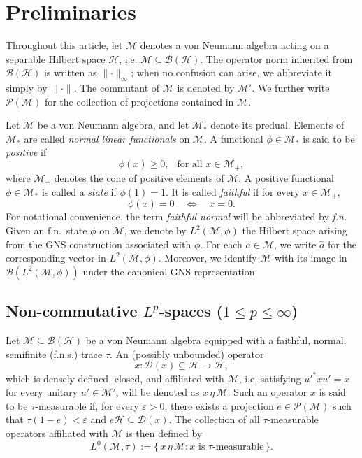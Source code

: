 \documentclass[11pt]{amsart}
\theoremstyle{definition}
\theoremstyle{myremark}
\numberwithin{equation}{section}
\newcommand{\CB}{\mathcal{B}}
\newcommand{\CM}{\mathcal{M}}
\begin{document}
\section{\textbf{Preliminaries}}\label{preli}
\noindent Throughout this article, let \(\mathcal{M}\) denotes a von Neumann algebra acting on a separable Hilbert space \(\mathcal{H}\),  i.e. $\mathcal{M}\subseteq \mathcal{B}(\mathcal{H})$. The operator norm inherited from \(\mathcal{B}(\mathcal{H})\) is written as \(\lVert \cdot \rVert_\infty\); when no confusion can arise, we abbreviate it simply by \(\lVert \cdot \rVert\). The commutant of \(\mathcal{M}\) is denoted by \(\mathcal{M}'\). We further write \(\mathcal{P}(\mathcal{M})\) for the collection of projections contained in \(\mathcal{M}\).






Let $\CM$ be a von Neumann algebra, and let $\CM_*$ denote its predual. Elements of $\CM_*$ are called \emph{normal linear functionals} on $\CM$. A functional $\phi \in \CM_*$ is said to be \emph{positive} if
\[
\phi(x)\geq 0, ~~\text{ for all }  x\in \CM_+,
\]
where $\CM_+$ denotes the cone of positive elements of $\CM$.
A positive functional $\phi \in \CM_*$ is called a \emph{state} if $ \phi(1)=1.$
It is called \emph{faithful} if for every $x\in \CM_+$,
\[
\phi(x)=0 \quad \Longleftrightarrow \quad x=0.
\]
For notational convenience, the term \emph{faithful normal} will be abbreviated by \emph{f.n.} Given an f.n.\ state $\phi$ on $\CM$, we denote by $L^2(\CM,\phi)$ the Hilbert space arising from the GNS construction associated with $\phi$. For each $a\in \CM$, we write $\widehat{a}$ for the corresponding vector in $L^2(\CM,\phi)$. Moreover, we identify $\CM$ with its image in $\CB(L^2(\CM,\phi))$ under the canonical GNS representation.






\subsection{\textbf{Non-commutative $L^p$-spaces  ($1\leq p\leq\infty $)}}
Let \(\mathcal{M} \subseteq \mathcal{B}(\mathcal{H})\) be a von Neumann algebra equipped with a faithful, normal, semifinite (f.n.s.) trace \(\tau\). An (possibly unbounded) operator 
\[
x: \mathcal{D}(x) \subseteq \mathcal{H} \to \mathcal{H},
\]
which is densely defined, closed, and affiliated with \(\mathcal{M}\), i.e,  satisfying \(u'^{*} x u' = x\) for every unitary \(u' \in \mathcal{M}'\), will be denoted as \(x \,\eta\, \mathcal{M}\). Such an operator \(x\) is said to be \(\tau\)-measurable if, for every \(\varepsilon > 0\), there exists a projection \(e \in \mathcal{P}(\mathcal{M})\) such that \(\tau(1-e) < \varepsilon\) and \(e\mathcal{H} \subseteq \mathcal{D}(x)\). The collection of all \(\tau\)-measurable operators affiliated with \(\mathcal{M}\) is then defined by
\[
L^{0}(\mathcal{M},\tau) := \{\, x \,\eta\, \mathcal{M} : x \text{ is } \tau\text{-measurable}\,\}.
\]
\end{document}
